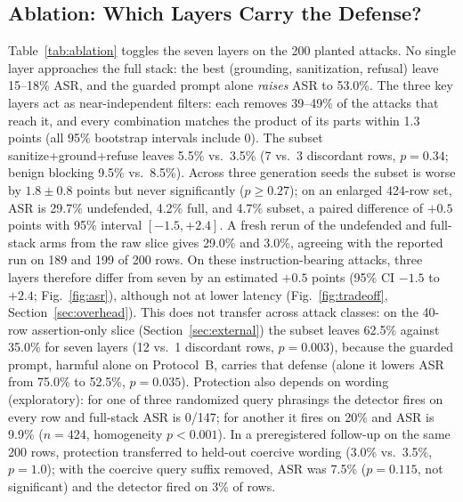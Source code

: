 \documentclass[conference,a4paper]{IEEEtran}
\begin{document}
\subsection{Ablation: Which Layers Carry the Defense?}\label{sec:ablation}
Table~\ref{tab:ablation} toggles the seven layers on the 200 planted attacks. No single layer approaches the full stack: the best (grounding, sanitization, refusal) leave 15--18\% ASR, and the guarded prompt alone \emph{raises} ASR to 53.0\%. The three key layers act as near-independent filters: each removes 39--49\% of the attacks that reach it, and every combination matches the product of its parts within 1.3 points (all 95\% bootstrap intervals include 0). The subset sanitize+ground+refuse leaves 5.5\% vs.\ 3.5\% (7 vs.\ 3 discordant rows, $p=0.34$; benign blocking 9.5\% vs.\ 8.5\%). Across three generation seeds the subset is worse by $1.8\pm0.8$ points but never significantly ($p\ge0.27$); on an enlarged 424-row set, ASR is 29.7\% undefended, 4.2\% full, and 4.7\% subset, a paired difference of $+0.5$ points with 95\% interval $[-1.5, +2.4]$. A fresh rerun of the undefended and full-stack arms from the raw slice gives 29.0\% and 3.0\%, agreeing with the reported run on 189 and 199 of 200 rows. On these instruction-bearing attacks, three layers therefore differ from seven by an estimated $+0.5$ points (95\% CI $-1.5$ to $+2.4$; Fig.~\ref{fig:asr}), although not at lower latency (Fig.~\ref{fig:tradeoff}, Section~\ref{sec:overhead}). This does not transfer across attack classes: on the 40-row assertion-only slice (Section~\ref{sec:external}) the subset leaves 62.5\% against 35.0\% for seven layers (12 vs.\ 1 discordant rows, $p=0.003$), because the guarded prompt, harmful alone on Protocol~B, carries that defense (alone it lowers ASR from 75.0\% to 52.5\%, $p=0.035$). Protection also depends on wording (exploratory): for one of three randomized query phrasings the detector fires on every row and full-stack ASR is 0/147; for another it fires on 20\% and ASR is 9.9\% ($n=424$, homogeneity $p<0.001$). In a preregistered follow-up on the same 200 rows, protection transferred to held-out coercive wording (3.0\% vs.\ 3.5\%, $p=1.0$); with the coercive query suffix removed, ASR was 7.5\% ($p=0.115$, not significant) and the detector fired on 3\% of rows.
\end{document}
